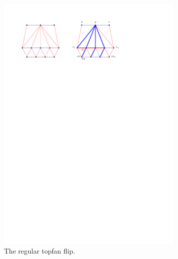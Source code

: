 

\begin{figure}[!b]
    \centering
    \begin{subfigure}[b]{0.8 \textwidth}
        \includegraphics[width = \textwidth]{topFanFlips/img/regular}
        \caption{The regular topfan flip.}
        \label{fig:fanflip:regular}
    \end{subfigure}
    ~
    \centering
    \begin{subfigure}[b]{0.45 \textwidth}

\end{subfigure}
\end{figure}
